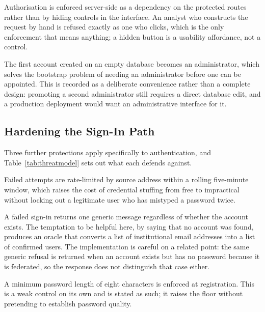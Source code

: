 Authorisation is enforced server-side as a dependency on the protected routes rather than by
hiding controls in the interface. An analyst who constructs the request by hand is refused
exactly as one who clicks, which is the only enforcement that means anything; a hidden button
is a usability affordance, not a control.

The first account created on an empty database becomes an administrator, which solves the
bootstrap problem of needing an administrator before one can be appointed. This is recorded as
a deliberate convenience rather than a complete design: promoting a second administrator still
requires a direct database edit, and a production deployment would want an administrative
interface for it.

\subsection{Hardening the Sign-In Path}

Three further protections apply specifically to authentication, and
Table~\ref{tab:threatmodel} sets out what each defends against.

Failed attempts are rate-limited by source address within a rolling five-minute window, which
raises the cost of credential stuffing from free to impractical without locking out a
legitimate user who has mistyped a password twice.

A failed sign-in returns one generic message regardless of whether the account exists. The
temptation to be helpful here, by saying that no account was found, produces an oracle that
converts a list of institutional email addresses into a list of confirmed users. The
implementation is careful on a related point: the same generic refusal is returned when an
account exists but has no password because it is federated, so the response does not
distinguish that case either.

A minimum password length of eight characters is enforced at registration. This is a weak
control on its own and is stated as such; it raises the floor without pretending to establish
password quality.

